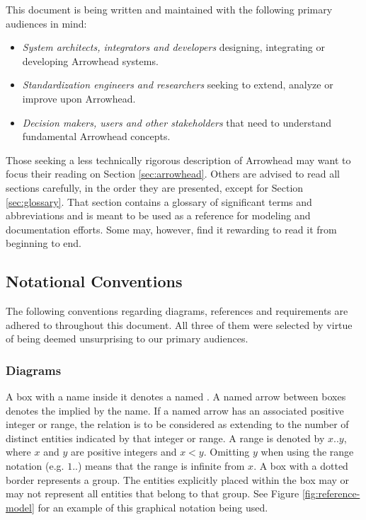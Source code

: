 This document is being written and maintained with the following primary audiences in mind:

\begin{itemize}
\item \textit{System architects, integrators and developers} designing, integrating or developing Arrowhead systems.
\item \textit{Standardization engineers and researchers} seeking to extend, analyze or improve upon Arrowhead.
\item \textit{Decision makers, users and other stakeholders} that need to understand fundamental Arrowhead concepts.
\end{itemize}

Those seeking a less technically rigorous description of Arrowhead may want to focus their reading on Section \ref{sec:arrowhead}.
Others are advised to read all sections carefully, in the order they are presented, except for Section \ref{sec:glossary}.
That section contains a glossary of significant terms and abbreviations and is meant to be used as a reference for modeling and documentation efforts.
Some may, however, find it rewarding to read it from beginning to end.

\subsection{Notational Conventions}
\label{sec:introduction:conventions}

The following conventions regarding diagrams, references and requirements are adhered to throughout this document.
All three of them were selected by virtue of being deemed unsurprising to our primary audiences.

\subsubsection{Diagrams}

A box with a name inside it denotes a named .
A named arrow between boxes denotes the  implied by the name.
If a named arrow has an associated positive integer or range, the relation is to be considered as extending to the number of distinct entities indicated by that integer or range.
A range is denoted by $x..y$, where $x$ and $y$ are positive integers and $x<y$.
Omitting $y$ when using the range notation (e.g. $1..$) means that the range is infinite from $x$.
A box with a dotted border represents a group.
The entities explicitly placed within the box may or may not represent all entities that belong to that group.
See Figure \ref{fig:reference-model} for an example of this graphical notation being used.

